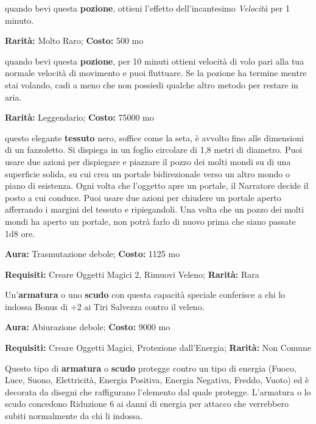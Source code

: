 \begin{multicols}{2}
quando bevi questa \textbf{pozione}, ottieni l'effetto dell'incantesimo \emph{Velocità} per 1 minuto.


\textbf{Rarità:} Molto Raro; \textbf{Costo:} 500 mo

quando bevi questa \textbf{pozione}, per 10 minuti ottieni velocità di volo pari alla tua normale velocità di movimento e puoi fluttuare. Se la pozione ha termine mentre stai volando, cadi a meno che non possiedi qualche altro metodo per restare in aria.


\textbf{Rarità:} Leggendario; \textbf{Costo:} 75000 mo

questo elegante \textbf{tessuto} nero, soffice come la seta, è avvolto fino alle dimensioni di un fazzoletto. Si dispiega in un foglio circolare di 1,8 metri di diametro. Puoi usare due azioni per dispiegare e piazzare il pozzo dei molti mondi su di una superficie solida, su cui crea un portale bidirezionale verso un altro mondo o piano di esistenza. Ogni volta che l'oggetto apre un portale, il Narratore decide il posto a cui conduce. Puoi usare due azioni per chiudere un portale aperto afferrando i margini del tessuto e ripiegandoli. Una volta che un pozzo dei molti mondi ha aperto un portale, non potrà farlo di nuovo prima che siano passate 1d8 ore.


\textbf{Aura:} Trasmutazione debole; \textbf{Costo:} 1125 mo

\textbf{Requisiti:} Creare Oggetti Magici 2, Rimuovi Veleno; \textbf{Rarità:} Rara

Un'\textbf{armatura} o uno \textbf{scudo} con questa capacità speciale conferisce a chi lo indossa Bonus di +2 ai Tiri Salvezza contro il veleno.


\textbf{Aura:} Abiurazione debole; \textbf{Costo:} 9000 mo

\textbf{Requisiti:} Creare Oggetti Magici, Protezione dall'Energia; \textbf{Rarità:} Non Comune

Questo tipo di \textbf{armatura} o \textbf{scudo} protegge contro un tipo di energia (Fuoco, Luce, Suono, Elettricità, Energia Positiva, Energia Negativa, Freddo, Vuoto) ed è decorata da disegni che raffigurano l'elemento dal quale protegge. L'armatura o lo scudo concedono Riduzione 6 ai danni di energia per attacco che verrebbero subiti normalmente da chi li indossa.


\end{multicols}
